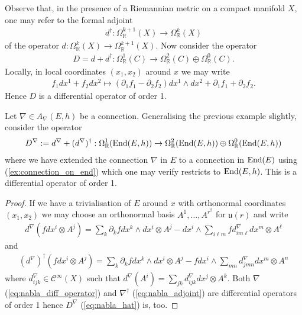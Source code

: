 \documentclass[12pt]{ociamthesis}  %
\begin{document}
\begin{example}
  Observe that, in the presence of a Riemannian metric on a compact
  manifold $X$, one may refer to the formal adjoint
  \begin{align*}
    d^\dagger : \Omega^{k+1}_{\mathbb{R}}(X)\to \Omega^{k}_{\mathbb{R}}(X)
  \end{align*}
  of the operator $d : \Omega^k_{\mathbb{R}}(X)\to\Omega^{k+1}_{\mathbb{R}}(X)$.
  Now consider the operator
  \begin{align}\label{eq:d_hat}
    D = d + d^\dagger : \Omega^1_{\mathbb R}(C) \to \Omega^2_{\mathbb R}(C) \oplus \Omega^0_{\mathbb R}(C).
  \end{align}
  Locally, in local coordinates $(x_1,x_2)$ around $x$ we may write
  \begin{align*}
    f_1 dx^1 + f_2 dx^2 \mapsto
    (\partial_1 f_1 - \partial_2 f_2)dx^1\wedge dx^2
    + \partial_1 f_1 + \partial_2 f_2 .
  \end{align*}
  Hence $D$ is a differential operator of order 1.
\end{example}

\begin{example}
  Let $\nabla\in A_\nabla(E,h)$ be a connection. Generalising the previous
  example slightly, consider the operator
  \begin{align}\label{eq:nabla_hat}
    D^\nabla := d^\nabla + (d^\nabla)^\dagger :
    \Omega^1_{\mathbb R}(\operatorname{End}(E,h)) \to
    \Omega^2_{\mathbb R}(\operatorname{End}(E,h)) \oplus
    \Omega^0_{\mathbb R}(\operatorname{End}(E,h))
  \end{align}
  where we have extended the connection $\nabla$ in $E$ to a connection
  in $\operatorname{End}(E)$ using (\ref{ex:connection_on_end}) which
  one may verify restricts to $\operatorname{End}(E,h)$. This is a
  differential operator of order 1.
  \begin{proof}
    If we have a trivialisation of $E$ around $x$ with orthonormal coordinates
    $(x_1,x_2)$ we may choose an orthonormal basis $A^1,\ldots,A^{r^2}$ for
    $\mathfrak u(r)$ and write
    \begin{align}\label{eq:nabla_diff_operator}
      d^\nabla\left(fdx^i\otimes A^j\right)
      = \sum_k \partial_k f dx^k\wedge dx^i \otimes A^j
      - dx^i\wedge\sum_{i\ell m} fd^\nabla_{im\ell}dx^m\otimes A^\ell
    \end{align}
    and
    \begin{align}\label{eq:nabla_adjoint}
      (d^\nabla)^\dagger\left(fdx^i \otimes A^j\right)
      = \sum_k \partial_k fdx^k\wedge dx^i\otimes A^j
      - fdx^i \wedge \sum_{mn} d^\nabla_{jmn}dx^m\otimes A^n
    \end{align}
    where $d^\nabla_{ijk}\in \mathscr C^\infty(X)$ such that
    $d^\nabla(A^i) = \sum_{jk}d^\nabla_{ijk}dx^j\otimes A^k$. Both
    $\nabla$ (\ref{eq:nabla_diff_operator}) and $\nabla^\dagger$
    (\ref{eq:nabla_adjoint}) are differential operators of order 1 hence
    $D^\nabla$ (\ref{eq:nabla_hat}) is, too.
  \end{proof}
\end{example}
\end{document}
